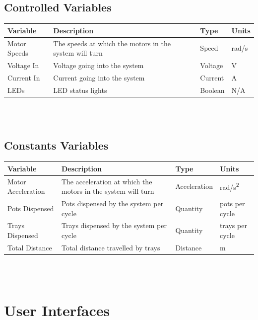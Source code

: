 \documentclass[12pt, titlepage]{article}
\begin{document}
\subsection{Controlled Variables}

\begin{tabular}{ |p{3cm}|p{9cm}|p{2cm}|p{1cm}| }
  \hline
  Variable & Description & Type & Units\\
  \hline
  Motor Speeds & The speeds at which the motors in the system will turn
   & Speed & rad/s\\
  \hline
  Voltage In & Voltage going into the system
   & Voltage & V\\
  \hline
  Current In & Current going into the system
   & Current &  A\\
  \hline
  LEDs & LED status lights
   & Boolean & N/A\\
  
  \hline
 \end{tabular}\\\\

\subsection{Constants Variables}

\begin{tabular}{ |p{3cm}|p{8.9cm}|p{2.1cm}|p{1cm}| }
  \hline
  Variable & Description & Type & Units\\
  \hline
  Motor Acceleration & The acceleration at which the motors in the system will turn
   & Acceleration & rad/s\textsuperscript{2}\\
  \hline
  Pots Dispensed & Pots dispensed by the system per cycle
   & Quantity & pots per cycle\\
  \hline
  Trays Dispensed & Trays dispensed by the system per cycle
   & Quantity &  trays per cycle\\
  \hline
  Total Distance & Total distance travelled by trays
   & Distance & m\\
  
  \hline
 \end{tabular}\\\\

\section{User Interfaces}

\end{document}
